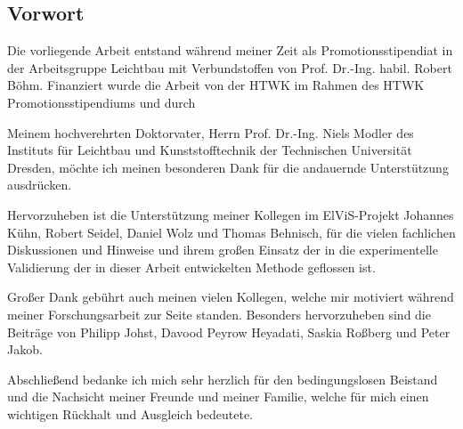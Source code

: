 \hypersetup{pageanchor=false}
\thispagestyle{empty}
\cleardoublepage

\thispagestyle{empty}

\vspace*{\fill}\vspace*{\fill}\vspace*{\fill}\vspace*{\fill}\vspace*{\fill}

\subsection*{Vorwort}

Die vorliegende Arbeit entstand während meiner Zeit als Promotionsstipendiat in der Arbeitsgruppe Leichtbau mit Verbundstoffen von Prof. Dr.-Ing. habil. Robert Böhm. Finanziert wurde die Arbeit von der HTWK im Rahmen des HTWK Promotionsstipendiums und durch 

Meinem hochverehrten Doktorvater, Herrn Prof. Dr.-Ing. Niels Modler des Instituts für Leichtbau und Kunststofftechnik der Technischen Universität Dresden, möchte ich meinen besonderen Dank für die andauernde Unterstützung ausdrücken.

Hervorzuheben ist die Unterstützung meiner Kollegen im ElViS-Projekt Johannes Kühn, Robert Seidel, Daniel Wolz und Thomas Behnisch, für die vielen fachlichen Diskussionen und Hinweise und ihrem großen Einsatz der in die experimentelle Validierung der in dieser Arbeit entwickelten Methode geflossen ist.

Großer Dank gebührt auch meinen vielen Kollegen, welche mir motiviert während meiner Forschungsarbeit zur Seite standen. Besonders hervorzuheben sind die Beiträge von Philipp Johst, Davood Peyrow Heyadati, Saskia Roßberg und Peter Jakob.

Abschließend bedanke ich mich sehr herzlich für den bedingungslosen Beistand und die Nachsicht meiner Freunde und meiner Familie, welche für mich einen wichtigen Rückhalt und Ausgleich bedeutete.


\cleardoublepage
\hypersetup{pageanchor=true}
